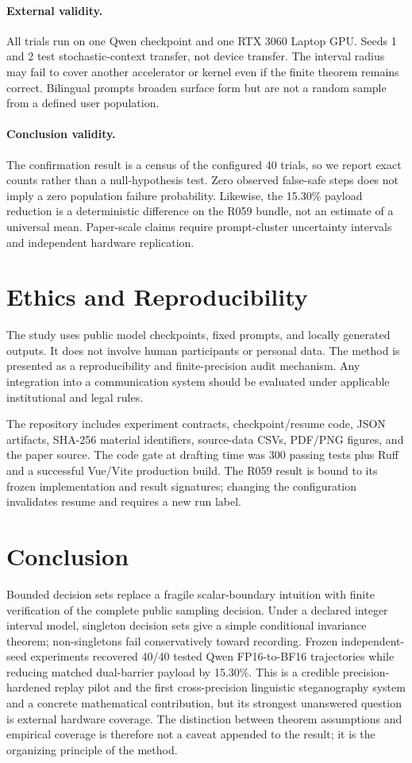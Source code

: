 \documentclass[sigconf,review,nonacm]{acmart}
\begin{document}
\paragraph{External validity.}
All trials run on one Qwen checkpoint and one RTX 3060 Laptop GPU. Seeds 1 and 2 test stochastic-context transfer, not device transfer. The interval radius may fail to cover another accelerator or kernel even if the finite theorem remains correct. Bilingual prompts broaden surface form but are not a random sample from a defined user population.

\paragraph{Conclusion validity.}
The confirmation result is a census of the configured 40 trials, so we report exact counts rather than a null-hypothesis test. Zero observed false-safe steps does not imply a zero population failure probability. Likewise, the 15.30\% payload reduction is a deterministic difference on the R059 bundle, not an estimate of a universal mean. Paper-scale claims require prompt-cluster uncertainty intervals and independent hardware replication.

\section{Ethics and Reproducibility}
The study uses public model checkpoints, fixed prompts, and locally generated outputs. It does not involve human participants or personal data. The method is presented as a reproducibility and finite-precision audit mechanism. Any integration into a communication system should be evaluated under applicable institutional and legal rules.

The repository includes experiment contracts, checkpoint/resume code, JSON artifacts, SHA-256 material identifiers, source-data CSVs, PDF/PNG figures, and the paper source. The code gate at drafting time was 300 passing tests plus Ruff and a successful Vue/Vite production build. The R059 result is bound to its frozen implementation and result signatures; changing the configuration invalidates resume and requires a new run label.

\section{Conclusion}
Bounded decision sets replace a fragile scalar-boundary intuition with finite verification of the complete public sampling decision. Under a declared integer interval model, singleton decision sets give a simple conditional invariance theorem; non-singletons fail conservatively toward recording. Frozen independent-seed experiments recovered 40/40 tested Qwen FP16-to-BF16 trajectories while reducing matched dual-barrier payload by 15.30\%. This is a credible precision-hardened replay pilot and the first cross-precision linguistic steganography system and a concrete mathematical contribution, but its strongest unanswered question is external hardware coverage. The distinction between theorem assumptions and empirical coverage is therefore not a caveat appended to the result; it is the organizing principle of the method.
\end{document}
